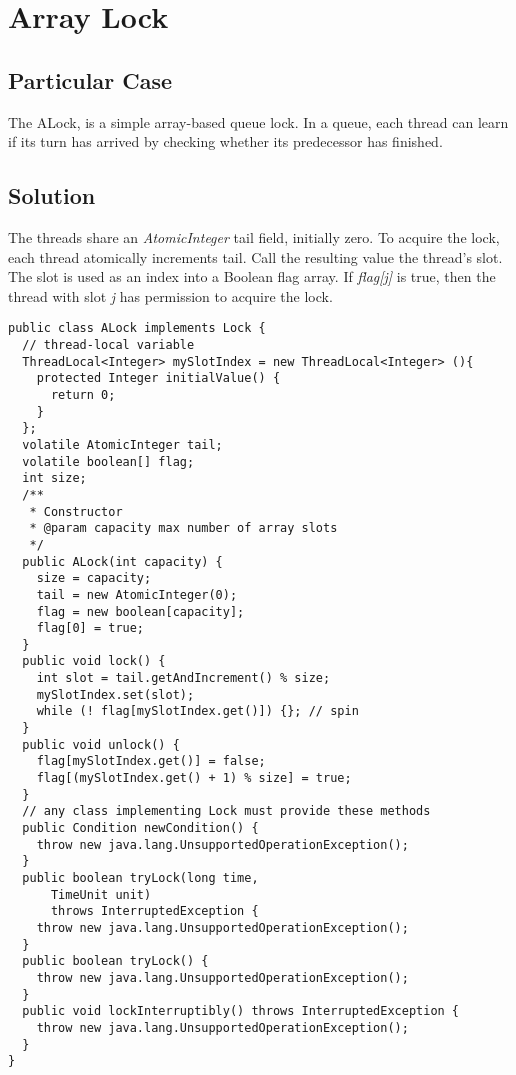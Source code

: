 


\section{\textbf{Array Lock}}



\subsection{Particular Case}
\par
The ALock, is a simple array-based queue lock. In a queue, each thread can learn if its turn has arrived by checking whether its predecessor has finished.
\par



\subsection{Solution}
\par
The threads share an \textit{AtomicInteger} tail field, initially zero. To acquire the lock, each thread atomically increments tail. Call the resulting value the thread’s slot. The slot is used as an index into a Boolean flag array. If \textit{flag[j]} is true, then the thread with slot \textit{j} has permission to acquire the lock.
\begin{lstlisting}[frame=single,breaklines=true]
public class ALock implements Lock {
  // thread-local variable
  ThreadLocal<Integer> mySlotIndex = new ThreadLocal<Integer> (){
    protected Integer initialValue() {
      return 0;
    }
  };
  volatile AtomicInteger tail;
  volatile boolean[] flag;
  int size;
  /**
   * Constructor
   * @param capacity max number of array slots
   */
  public ALock(int capacity) {
    size = capacity;
    tail = new AtomicInteger(0);
    flag = new boolean[capacity];
    flag[0] = true;
  }
  public void lock() {
    int slot = tail.getAndIncrement() % size;
    mySlotIndex.set(slot);
    while (! flag[mySlotIndex.get()]) {}; // spin
  }
  public void unlock() {
    flag[mySlotIndex.get()] = false;
    flag[(mySlotIndex.get() + 1) % size] = true;
  }
  // any class implementing Lock must provide these methods
  public Condition newCondition() {
    throw new java.lang.UnsupportedOperationException();
  }
  public boolean tryLock(long time,
      TimeUnit unit)
      throws InterruptedException {
    throw new java.lang.UnsupportedOperationException();
  }
  public boolean tryLock() {
    throw new java.lang.UnsupportedOperationException();
  }
  public void lockInterruptibly() throws InterruptedException {
    throw new java.lang.UnsupportedOperationException();
  }
}
\end{lstlisting}
\par


